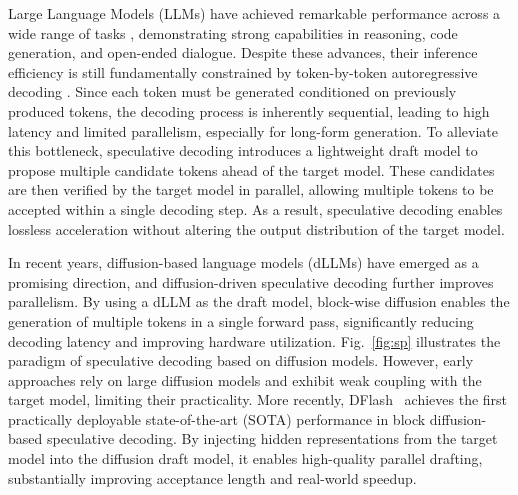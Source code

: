 \documentclass{llmxive}
\begin{document}
Large Language Models (LLMs) \cite{touvron2023open,yang2025qwen3,chiang2023vicuna} have achieved remarkable performance across a wide range of tasks \citep{annepaka2025large,hadi2023large}, demonstrating strong capabilities in reasoning, code generation, and open-ended dialogue. Despite these advances, their inference efficiency is still fundamentally constrained by token-by-token autoregressive decoding \cite{tay2022efficient,papa2024survey,wan2023efficient}. Since each token must be generated conditioned on previously produced tokens, the decoding process is inherently sequential, leading to high latency and limited parallelism, especially for long-form generation. To alleviate this bottleneck, speculative decoding \cite{leviathan2023fastinferencetransformersspeculative, li2025eaglespeculativesamplingrequires, li2024eagle2fasterinferencelanguage, li2025eagle3scalinginferenceacceleration, cai2024medusasimplellminference} introduces a lightweight draft model to propose multiple candidate tokens ahead of the target model. These candidates are then verified by the target model in parallel, allowing multiple tokens to be accepted within a single decoding step. As a result, speculative decoding enables lossless acceleration without altering the output distribution of the target model.




In recent years, diffusion-based language models (dLLMs) \cite{nie2025largelanguagediffusionmodels, arriola2025blockdiffusioninterpolatingautoregressive, wu2025fastdllmv2efficientblockdiffusion, cheng2025sdarsynergisticdiffusionautoregressionparadigm} have emerged as a promising direction, and diffusion-driven speculative decoding further improves parallelism. By using a dLLM as the draft model, block-wise diffusion enables the generation of multiple tokens in a single forward pass, significantly reducing decoding latency and improving hardware utilization. Fig.~\ref{fig:sp} illustrates the paradigm of speculative decoding based on diffusion models. However, early approaches \cite{li2025diffuspecunlockingdiffusionlanguage,sandler2025specdiff2scalingdiffusiondrafter,samragh2025llmknowsfutureuncovering} rely on large diffusion models and exhibit weak coupling with the target model, limiting their practicality. More recently, DFlash~\cite{chen2026dflash} achieves the first practically deployable state-of-the-art (SOTA) performance in block diffusion-based speculative decoding. By injecting hidden representations from the target model into the diffusion draft model, it enables high-quality parallel drafting, substantially improving acceptance length and real-world speedup. 
\end{document}
